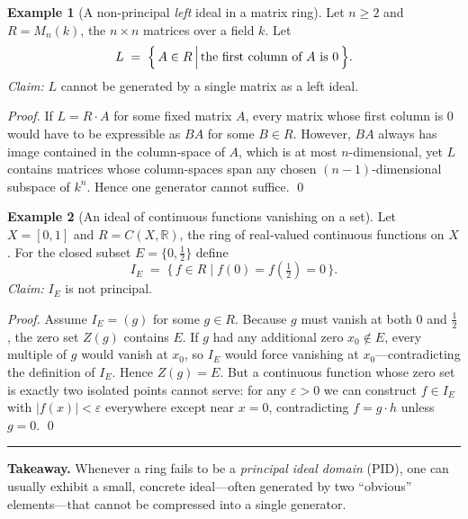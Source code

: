 \documentclass[12pt]{article}
\theoremstyle{definition} %
\newtheorem{example}{Example}
\theoremstyle{plain} %
\begin{document}
    \bigskip
    \begin{example}[A non-principal \textit{left} ideal in a matrix ring]
    Let $n\ge 2$ and $R=M_n(k)$, the $n\times n$ matrices over a field $k$.
    Let
    \[
    L \;=\; \Bigl\{\,A\in R \,\Big|\, \text{the first column of $A$ is }0\,\Bigr\}.
    \]
    \emph{Claim:} $L$ cannot be generated by a single matrix as a left ideal.
    
    \emph{Proof.}
    If $L=R\cdot A$ for some fixed matrix $A$, every matrix whose first column is $0$
    would have to be expressible as $BA$ for some $B\in R$.
    However, $BA$ always has image contained in the column‐space of $A$, which is at most $n$-dimensional,
    yet $L$ contains matrices whose column-spaces span any chosen $(n-1)$-dimensional subspace of $k^{n}$.
    Hence one generator cannot suffice. \qed
    \end{example}
    
    \bigskip
    \begin{example}[An ideal of continuous functions vanishing on a set]
    Let $X=[0,1]$ and $R=C(X,\mathbb R)$, the ring of real‐valued continuous functions on $X$.
    For the closed subset $E=\{0,\tfrac12\}$ define
    \[
    I_E \;=\; \{\,f\in R \mid f(0)=f(\tfrac12)=0\,\}.
    \]
    \emph{Claim:} $I_E$ is not principal.
    
    \emph{Proof.}
    Assume $I_E=(g)$ for some $g\in R$.
    Because $g$ must vanish at both $0$ and $\tfrac12$, the zero set $Z(g)$ contains $E$.
    If $g$ had any additional zero $x_0\not\in E$, every multiple of $g$ would vanish at $x_0$, so $I_E$ would force vanishing at $x_0$—contradicting the definition of $I_E$.
    Hence $Z(g)=E$.  
    But a continuous function whose zero set is exactly two isolated points cannot serve:
    for any $\varepsilon>0$ we can construct $f\in I_E$ with $|f(x)|<\varepsilon$ everywhere except near $x=0$, contradicting $f=g\cdot h$ unless $g=0$.  \qed
    \end{example}
    
    \bigskip
    \hrule
    \medskip
    \textbf{Takeaway.}  
    Whenever a ring fails to be a \emph{principal ideal domain} (PID), one can usually exhibit a small, concrete ideal—often generated by two “obvious” elements—that cannot be compressed into a single generator.
\end{document}
